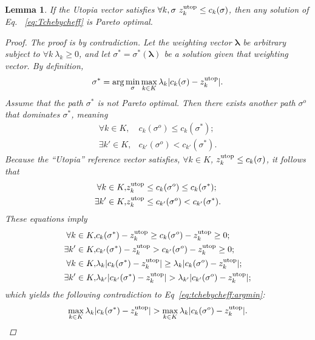 \documentclass{article}
\newtheorem{lem}{Lemma}
\begin{document}
\begin{lem}
\label{lem:sol_pareto_opt}
If the Utopia vector satisfies $\forall k,\sigma\  z_k^{\rm utop}\leq c_{k}( \sigma)$, then any solution of Eq.~ \eqref{eq:Tchebycheff} is Pareto optimal.
\begin{proof}
The proof is by contradiction.  
Let the weighting vector ${\mathbf \lambda}$ be arbitrary subject to $\forall k\ \lambda_k\geq 0$, and let $ \sigma^*=\sigma^{*}({\mathbf \lambda}) $ be a solution given that weighting vector. 
By definition, 
\begin{equation}
\label{eq:tchebycheff:argmin}
\sigma^{*} = \arg \min_{ \sigma } \max_{ k \in K }  \lambda_{k} | c_{k}( \sigma ) - z^{\rm utop}_{k} | .
\end{equation}
Assume that the path $ \sigma^{*} $ is not Pareto optimal.
Then there exists another path $ \sigma^{o} $ that dominates $ \sigma^{*} $, meaning
\begin{eqnarray}
\nonumber
\forall k \in K , & c_{k}( \sigma^{o} ) \leq c_{k}( \sigma^{*} ); \\
\nonumber
\exists k' \in K , & c_{k'}( \sigma^{o} ) < c_{k'}( \sigma^{*} ).
\end{eqnarray}
Because the ``Utopia'' reference vector satisfies,  $ \forall k \in K $, $ z^{\rm utop}_{k} \leq  c_{k}( \sigma ) $, it follows that
\begin{eqnarray}
\nonumber
\forall k \in K , & z^{\rm utop}_{k} \leq c_{k}( \sigma^{o} ) \leq c_{k}( \sigma^{*} ) ; \\
\nonumber
\exists k' \in K , & z^{\rm utop}_{k} \leq c_{k'}( \sigma^{o} ) < c_{k'}( \sigma^{*} ).
\end{eqnarray}
These equations imply
\begin{eqnarray}
\nonumber
\forall k \in K , & c_{k}( \sigma^{*} ) - z^{\rm utop}_{k} \geq c_{k}( \sigma^{o} ) - z^{\rm utop}_{k} \geq 0 ; \\
\nonumber
\exists k' \in K , &  c_{k'}( \sigma^{*} ) - z^{\rm utop}_{k} > c_{k'}( \sigma^{o} ) - z^{\rm utop}_{k} \geq 0 ;\\
\nonumber
\forall k \in K , & \lambda_{k} | c_{k}( \sigma^{*} ) - z^{\rm utop}_{k} | \geq \lambda_{k}  | c_{k}( \sigma^{o} ) - z^{\rm utop}_{k} | ; \\
\nonumber
\exists k' \in K , & \lambda_{k'}  | c_{k'}( \sigma^{*} ) - z^{\rm utop}_{k} | > \lambda_{k'}  | c_{k'}( \sigma^{o} ) - z^{\rm utop}_{k} | ;
\end{eqnarray}
which yields the following contradiction to Eq~\eqref{eq:tchebycheff:argmin}:
\begin{equation}
\nonumber
\max_{ k \in K }  \lambda_{k} | c_{k}( \sigma^{*} ) - z^{\rm utop}_{k} | > \max_{ k \in K } \lambda_{k}  | c_{k}( \sigma^{o} ) - z^{\rm utop}_{k} |.
\end{equation}
\end{proof}
\end{lem}
\end{document}
